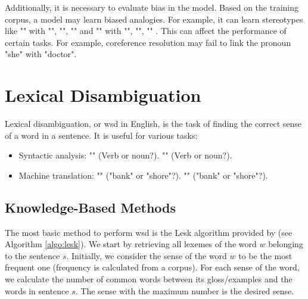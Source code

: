 \documentclass{KBook}
\begin{document}
Additionally, it is necessary to evaluate bias in the model. Based on the training corpus, a model may learn biased analogies. For example, it can learn stereotypes like "" with "", "", "" and "" with "", "", "" \cite{2017-caliskan-al}. This can affect the performance of certain tasks. For example, coreference resolution may fail to link the pronoun "she" with "doctor".


\section{Lexical Disambiguation}

Lexical disambiguation, or \ac{wsd} in English, is the task of finding the correct sense of a word in a sentence. It is useful for various tasks:
\begin{itemize}
	\item Syntactic analysis: "" (Verb or noun?). "" (Verb or noun?).
	
	\item Machine translation: "" ("bank" or "shore"?). "" ("bank" or "shore"?).
\end{itemize}

\subsection{Knowledge-Based Methods}

The most basic method to perform \ac{wsd} is the Lesk algorithm provided by  (see Algorithm \ref{algo:lesk}). 
We start by retrieving all lexemes of the word $w$ belonging to the sentence $s$. 
Initially, we consider the sense of the word $w$ to be the most frequent one (frequency is calculated from a corpus). 
For each sense of the word, we calculate the number of common words between its gloss/examples and the words in sentence $s$. 
The sense with the maximum number is the desired sense.
\end{document}
